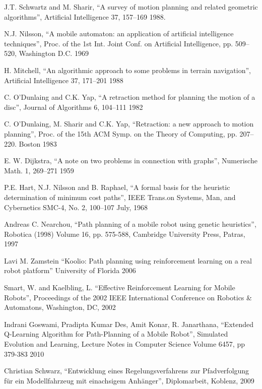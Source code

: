 \documentclass[bsc,en,
oneside,12pt,utf8,a4paper,
]{thesisdifctunl}
\begin{document}
\begin{thebibliography}{9}

  J.T. Schwartz and M. Sharir,
  "`A survey of motion planning and related geometric algorithms"',
  Artificial Intelligence 37, 157–169
  1988.
	
	N.J. Nilsson,
	“A mobile automaton: an application of artificial intelligence techniques”,
	Proc. of the 1st Int. Joint Conf. on Artificial Intelligence, pp. 509–520,
	Washington D.C.
	1969

	H. Mitchell, 
	“An algorithmic approach to some problems in terrain navigation”,
	Artificial Intelligence 37, 171–201
	1988

	C. O’Dunlaing and C.K. Yap,
	“A retraction method for planning the motion of a disc”,
	Journal of Algorithms 6, 104–111 
	1982

	C. O’Dunlaing, M. Sharir and C.K. Yap,
	“Retraction: a new approach to motion planning”,
	Proc. of the 15th ACM Symp. on the Theory of Computing, pp. 207–220.
	Boston
	1983
	
	E. W. Dijkstra,
	“A note on two problems in connection with graphs”,
	Numerische Math. 1, 269–271 
	1959
	
	P.E. Hart, N.J. Nilsson and B. Raphael,
	“A formal basis for the heuristic determination of minimum cost paths”,
	IEEE Trans.on Systems, Man, and Cybernetics SMC-4, No. 2, 100–107
	July, 1968
	
	Andreas C. Nearchou,
	"`Path planning of a mobile robot using genetic heuristics"',
	Robotica (1998) Volume 16, pp. 575-588,
	Cambridge University Press,
	Patras,
	1997	
	
	Lavi M. Zamstein
	"`Koolio: Path planning using reinforcement learning on a real robot platform"'
	University of Florida
	2006
	
	Smart, W. and Kaelbling, L.
	"`Effective Reinforcement Learning for Mobile Robots"',
	Proceedings of the 2002 IEEE International Conference on Robotics & Automatons,
	Washington, DC,
	2002
	
	Indrani Goswami, Pradipta Kumar Des, Amit Konar, R. Janarthana,
	"`Extended Q-Learning Algorithm for Path-Planning of a Mobile Robot"',
	Simulated Evolution and Learning, Lecture Notes in Computer Science Volume 6457, pp 379-383
	2010

	Christian Schwarz,
	"`Entwicklung eines Regelungsverfahrens zur Pfadverfolgung für ein Modellfahrzeug mit einachsigem Anhänger"',
	Diplomarbeit,
	Koblenz,
	2009
	

\end{thebibliography}
\end{document}
